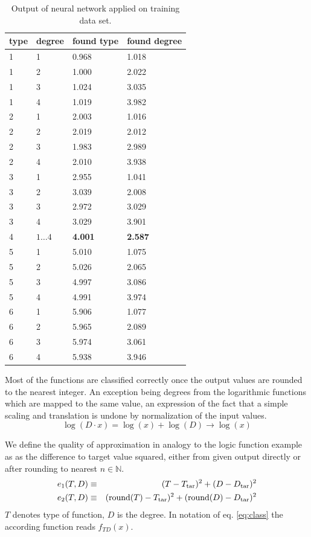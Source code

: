 \documentclass[useAMS,usenatbib]{mn2e}
\begin{document}
\begin{table}
\begin{center}
\begin{tabular}{llll}\hline\hline
type&degree&found type&found degree\\
\hline
1 & 1 & 0.968 & 1.018 \\
1 & 2 & 1.000 & 2.022 \\
1 & 3 & 1.024 & 3.035 \\
1 & 4 & 1.019 & 3.982 \\
\hline
2 & 1 & 2.003 & 1.016 \\
2 & 2 & 2.019 & 2.012 \\
2 & 3 & 1.983 & 2.989 \\
2 & 4 & 2.010 & 3.938 \\
\hline
3 & 1 & 2.955 & 1.041 \\
3 & 2 & 3.039 & 2.008 \\
3 & 3 & 2.972 & 3.029 \\
3 & 4 & 3.029 & 3.901 \\
\hline
4 & $1\ldots4$ & {\bf 4.001} & {\bf 2.587} \\
\hline
5 & 1 & 5.010 & 1.075 \\
5 & 2 & 5.026 & 2.065 \\
5 & 3 & 4.997 & 3.086 \\
5 & 4 & 4.991 & 3.974 \\
\hline
6 & 1 & 5.906 & 1.077 \\
6 & 2 & 5.965 & 2.089 \\
6 & 3 & 5.974 & 3.061 \\
6 & 4 & 5.938 & 3.946 \\
\hline
\end{tabular}
\end{center}
\caption{\label{tab:td1} Output of neural network applied on training data set.}
\end{table}
%
Most of the functions are classified correctly once the output values
are rounded to the nearest integer. An exception being degrees from
the logarithmic functions which are mapped to the same value, an expression
of the fact that a simple scaling and translation is undone
by normalization of the input values.
%
\begin{equation}
  \log(D\cdot x) = \log(x)+\log(D)\to\log(x)
\end{equation}
%

%
We define the quality of approximation in analogy to the logic
function example as as the difference to target value squared, either
from given output directly or after rounding to nearest
$n\in\mathbb{N}$.
%
\begin{eqnarray}
  e_1(T,D)&\equiv&(T-T_{{\rm tar}})^2+(D-D_{{\rm tar}})^2\\
  e_2(T,D)&\equiv&({\rm round}(T)-T_{{\rm tar}})^2+({\rm round}(D)-D_{{\rm tar}})^2
\end{eqnarray}
%
$T$ denotes type of function, $D$ is the degree. In notation of
eq. \ref{eq:class} the according function reads $f_{TD}(x)$.
%
%
\end{document}
